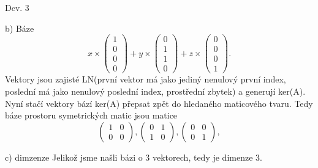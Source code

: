\documentclass[a4paper]{article}
\begin{document}
\begin{section}{Dcv. 3}
\begin{subsection}{b) Báze}
\[        x \times \begin{pmatrix} 1 \\ 0 \\ 0 \\ 0 \end{pmatrix}
        + y \times \begin{pmatrix} 0 \\ 1 \\ 1 \\ 0 \end{pmatrix} 
        + z \times \begin{pmatrix} 0 \\ 0 \\ 0 \\ 1 \end{pmatrix} 
    .\] 
    Vektory jsou zajisté LN(první vektor má jako jediný nenulový první index, poslední má jako nenulový poslední index, prostřední zbytek) a generují ker(A).
    Nyní stačí vektory bází ker(A) přepsat zpět do hledaného maticového tvaru.
    Tedy báze prostoru symetrických matic jsou matice
    \[
        \begin{pmatrix} 1 & 0 \\ 0 & 0 \end{pmatrix},
        \begin{pmatrix} 0 & 1 \\ 1 & 0 \end{pmatrix},
        \begin{pmatrix} 0 & 0 \\ 0 & 1 \end{pmatrix},
    \]
\end{subsection}
\begin{subsection}{c) dimzenze}
    Jelikož jsme našli bázi o 3 vektorech, tedy je dimenze 3.
\end{subsection}
\end{section}
\end{document}
